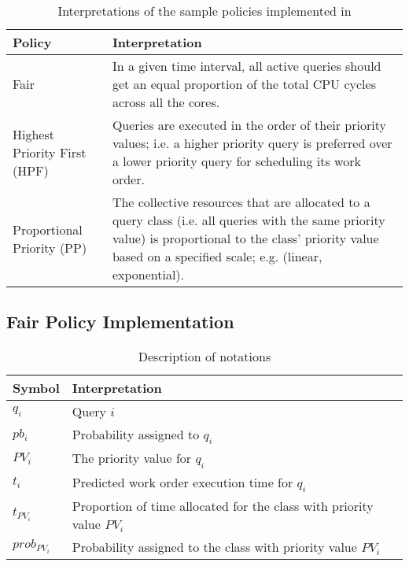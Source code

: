 \begin{table}[t]
\centering
\begin{tabular}{|p{1.3cm}|p{6.5cm}|}
\hline
\textbf{Policy} & \textbf{Interpretation} \\ \hline
Fair & In a given time interval, all active queries should get an equal proportion of the total CPU cycles across all the cores. \\ \hline%
Highest Priority First (HPF) & 
Queries are executed in the order of their priority values; i.e. a higher priority query is preferred over a lower priority query for scheduling its work order. \\ \hline
Proportional Priority (PP) & 
The collective resources that are allocated to a query class (i.e. all queries with the same priority value) is proportional to the class' priority value based on a specified scale; e.g. (linear, exponential).
\\ \hline
\end{tabular}
\caption{Interpretations of the sample policies implemented in \sys{}}
\label{table:policy-interpreatations}
	\vspace{-2.5em}
\end{table}

\subsection{Fair Policy Implementation}\label{ssec:fairness}
\begin{table}[t]
	\centering
	\begin{tabular}{|p{}|p{}|}
		\hline
		\textbf{Symbol} & \textbf{Interpretation} \\ \hline
		$q_{i}$ & Query $i$ \\ \hline
		$pb_{i}$ & Probability assigned to $q_{i}$ \\ \hline
		$PV_{i}$ & The priority value for $q_{i}$ \\ \hline
		$t_{i}$ & Predicted work order execution time for $q_{i}$ \\ \hline
		$t_{PV_{i}}$ & Proportion of time allocated for the class with priority value $PV_{i}$ \\ \hline
		$prob_{PV_{i}}$ & Probability assigned to the class with priority value $PV_{i}$ \\ \hline
	\end{tabular}
	\vspace{0.4em}
	\caption{Description of notations}
	\label{table:policy-notations}
	\vspace{-2.5em}
\end{table}

